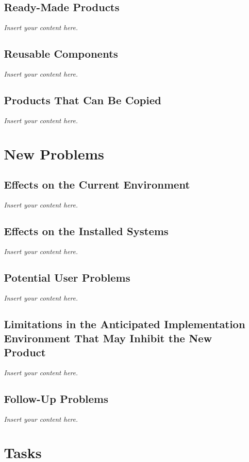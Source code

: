 \documentclass[12pt]{article}
\newcommand{\lips}{\textit{Insert your content here.}}
\begin{document}
\subsection{Ready-Made Products}
\lips
\subsection{Reusable Components}
\lips
\subsection{Products That Can Be Copied}
\lips

\section{New Problems}
\subsection{Effects on the Current Environment}
\lips
\subsection{Effects on the Installed Systems}
\lips
\subsection{Potential User Problems}
\lips
\subsection{Limitations in the Anticipated Implementation Environment That May
Inhibit the New Product}
\lips
\subsection{Follow-Up Problems}
\lips

\section{Tasks}
\end{document}

